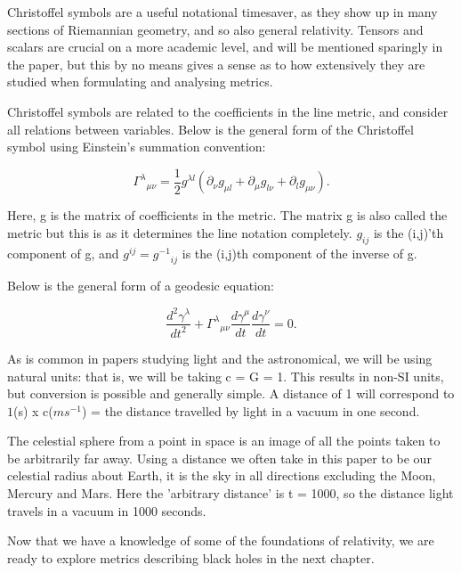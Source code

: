 \documentclass[oneside,openright,frontopenright, singlespacing]{dmathesis}
\begin{document}
\vspace{1em}
	Christoffel symbols are a useful notational timesaver, as they show up in many sections of Riemannian geometry, and so also general relativity. Tensors and scalars are crucial on a more academic level, and will be mentioned sparingly in the paper, but this by no means gives a sense as to how extensively they are studied when formulating and analysing metrics.

\vspace{1em}
	Christoffel symbols are related to the coefficients in the line metric, and consider all relations between variables. Below is the general form of the Christoffel symbol using Einstein's summation convention\cite[pg. 13-14]{albert1916foundation}:
	
	\[{\Gamma^\lambda}_{\mu\nu} = \frac{1}{2}g^{\lambda{l}}(\partial_{\nu}g_{\mu{l}} + \partial_{\mu}g_{l\nu} + \partial_{l}g_{\mu\nu}).\]
	
\vspace{1em}
	Here, g is the matrix of coefficients in the metric. The matrix g is also called the metric but this is as it determines the line notation completely. $g_{ij}$ is the (i,j)'th component of g, and $g^{ij} = {g^{-1}}_{ij}$ is the (i,j)th component of the inverse of g.

\vspace{1em}
	Below is the general form of a geodesic equation\cite[pg. 156-157]{schutz2009first}:

	\[\frac{d^2 \gamma^\lambda}{dt^2} + {\Gamma^\lambda}_{\mu\nu} \frac{d\gamma^\mu}{dt} \frac{d\gamma^\nu}{dt} = 0.\]

\vspace{1em}
	As is common in papers studying light and the astronomical, we will be using natural units: that is, we will be taking c = G = 1. This results in non-SI units, but conversion is possible and generally simple. A distance of 1 will correspond to $1$(s) x c($ms^{-1}$) = the distance travelled by light in a vacuum in one second.

\vspace{1em}
	The celestial sphere from a point in space is an image of all the points taken to be arbitrarily far away. Using a distance we often take in this paper to be our celestial radius about Earth, it is the sky in all directions excluding the Moon, Mercury and Mars. Here the 'arbitrary distance' is t = 1000, so the distance light travels in a vacuum in 1000 seconds.

\vspace{1em}
	Now that we have a knowledge of some of the foundations of relativity, we are ready to explore metrics describing black holes in the next chapter.
\end{document}
